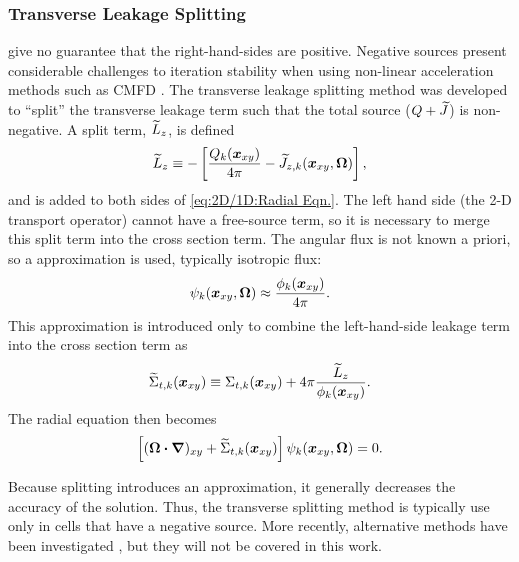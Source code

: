 {{{      \subsubsection{Transverse Leakage Splitting}{\label{sssec:3T:Transverse Leakage Splitting}
         give no guarantee that the right-hand-sides are positive.
        Negative sources present considerable challenges to iteration stability when using non-linear acceleration methods such as \ac{CMFD} \cite{Jarrett2018}.
        The transverse leakage splitting method \cite{Stimpson2015,Kelley2015} was developed to ``split'' the transverse leakage term such that the total source ($Q+\widetilde{J}$) is non-negative.
        A split term, $\widetilde{L}_{z}$, is defined
        \begin{equation}\label{eq:2D/1D:Split Term}
          \widetilde{L}_z \equiv -\left[\frac{Q_k(\boldsymbol{x}_{xy})}{4\pi} - \widetilde{J}_{z,k}(\boldsymbol{x}_{xy},\boldsymbol{\Omega})\right],
        \end{equation}
        and is added to both sides of \cref{eq:2D/1D:Radial Eqn.}.
        The left hand side (the 2-D transport operator) cannot have a free-source term, so it is necessary to merge this split term into the cross section term.
        The angular flux is not known a priori, so a approximation is used, typically isotropic flux:
        \begin{equation}\label{eq:2D/1D:Isotropic Flux}
          \psi_k(\boldsymbol{x}_{xy},\boldsymbol{\Omega}) \approx \frac{\phi_k(\boldsymbol{x}_{xy})}{4\pi}.
        \end{equation}
        This approximation is introduced only to combine the left-hand-side leakage term into the cross section term as
        \begin{equation}\label{eq:2D/1D:Split XS}
          \mxst[t,k](\rloc) \defined \xst[t,k](\rloc) + \fourpi\frac{\L_z}{\phi_k(\rloc)}.
        \end{equation}
        The radial equation then becomes
        \begin{equation}\label{eq:2D/1D:Split Radial Eqn.}
          \left[(\dir\vdot\grad)_{xy} + \mxst[t,k](\rloc)\right]\aflux_k(\rloc,\dir) = 0.
        \end{equation}

        Because splitting introduces an approximation, it generally decreases the accuracy of the solution.
        Thus, the transverse splitting method is typically use only in cells that have a negative source.
        More recently, alternative methods have been investigated \cite{Zhao2018}, but they will not be covered in this work.
      }
    }

}}
